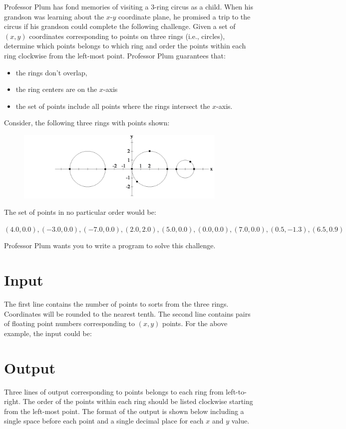 
Professor Plum has fond memories of visiting a $3$-ring circus as a child.  When his grandson was learning about the $x$-$y$ coordinate plane, he promised a trip to the circus if his grandson could complete the following challenge.  Given a set of $(x, y)$ coordinates corresponding to points on three rings (i.e., circles), determine which points belongs to which ring and order the points within each ring clockwise from the left-most point.  Professor Plum guarantees that:
\begin{itemize}
\itemsep 0in
\item the rings don’t overlap,
\item the ring centers are on the $x$-axis
\item the set of points include all points where the rings intersect the $x$-axis.  
\end{itemize}
Consider, the following three rings with points shown: \\ 

\begin{figure}[h]
\begin{center}
\includegraphics[width=0.9\textwidth]{problem2circle.png} 
\end{center}
\end{figure}

The set of points in no particular order would be:
\begin{center}
\begin{math}
(4.0, 0.0), (-3.0, 0.0), (-7.0, 0.0), (2.0, 2.0), (5.0, 0.0), (0.0, 0.0) , (7.0, 0.0), (0.5, -1.3), (6.5, 0.9)
\end{math}
\end{center}

Professor Plum wants you to write a program to solve this challenge.

\section*{Input}
The first line contains the number of points to sorts from the three rings.  Coordinates will be rounded to the nearest tenth.  The second line contains pairs of floating point numbers corresponding to $(x, y)$ points.  For the above example, the input could be:

\section*{Output}
Three lines of output corresponding to points belongs to each ring from left-to-right.  The order of the points within each ring should be listed clockwise starting from the left-most point.  The format of the output is shown below including a single space before each point and a single decimal place for each $x$ and $y$ value.